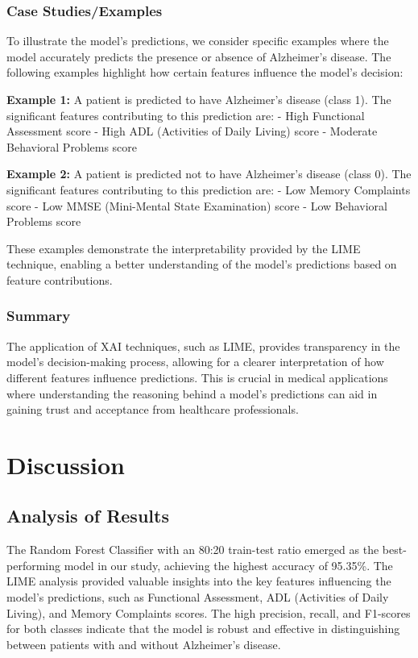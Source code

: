 \documentclass[a4paper,12pt]{report}
\begin{document}
\subsection{Case Studies/Examples}

To illustrate the model's predictions, we consider specific examples where the model accurately predicts the presence or absence of Alzheimer's disease. The following examples highlight how certain features influence the model's decision:

\textbf{Example 1:}
A patient is predicted to have Alzheimer's disease (class 1). The significant features contributing to this prediction are:
- High Functional Assessment score
- High ADL (Activities of Daily Living) score
- Moderate Behavioral Problems score

\textbf{Example 2:}
A patient is predicted not to have Alzheimer's disease (class 0). The significant features contributing to this prediction are:
- Low Memory Complaints score
- Low MMSE (Mini-Mental State Examination) score
- Low Behavioral Problems score

These examples demonstrate the interpretability provided by the LIME technique, enabling a better understanding of the model's predictions based on feature contributions.

\subsection{Summary}

The application of XAI techniques, such as LIME, provides transparency in the model's decision-making process, allowing for a clearer interpretation of how different features influence predictions. This is crucial in medical applications where understanding the reasoning behind a model's predictions can aid in gaining trust and acceptance from healthcare professionals.



\chapter{Discussion}

\section{Analysis of Results}

The Random Forest Classifier with an 80:20 train-test ratio emerged as the best-performing model in our study, achieving the highest accuracy of 95.35\%. The LIME analysis provided valuable insights into the key features influencing the model's predictions, such as Functional Assessment, ADL (Activities of Daily Living), and Memory Complaints scores. The high precision, recall, and F1-scores for both classes indicate that the model is robust and effective in distinguishing between patients with and without Alzheimer's disease.
\end{document}

